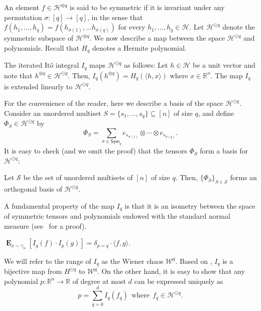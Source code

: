\documentclass{toc}
\begin{document}
An element $f  \in \mathcal{H}^{\otimes q}$ is said to be
symmetric if it is invariant under any permutation $\sigma: [q] \rightarrow
[q]$, in the sense that $f(h_1, \dots, h_q) = f(h_{\sigma(1)}, \dots
h_{\sigma(q)})$ for every $h_1, \dots, h_q \in \mathcal{H}$. Let
$\mathcal{H}^{\odot q}$ denote the symmetric subspace of
$\mathcal{H}^{\otimes q}$. 
%
%
%
%
We now describe a map
between the space $\mathcal{H}^{\odot q}$ and polynomials. Recall that $H_q$
denotes
a Hermite polynomial.
\begin{definition}
    The iterated It\^{o} integral $I_q$ maps $\mathcal{H}^{\odot q}$ as follows: Let $h \in \mathcal{H}$ be a unit vector and note that  $h^{\otimes q} \in \mathcal{H}^{\odot q}$. Then, 
$I_q(h^{\otimes q}) = H_q( \langle h , x \rangle)$ where $x \in \mathbb{R}^n$. The map $I_q$ is extended linearly to $\mathcal{H}^{\odot q}$. 
\end{definition}
For the convenience of the reader, here we describe a basis of the space $\mathcal{H}^{\odot q}$. Consider an unordered multiset $S = \{s_1, \ldots, s_q\} \subseteq [n]$ of size $q$, and define $\Phi_S \in \mathcal{H}^{\odot q}$ by
$$
\Phi_S = \sum_{\sigma \in \mathsf{Sym}_q} e_{s_{\sigma(1)}} \otimes \cdots \otimes e_{s_{\sigma(q)}}.
$$
It is easy to check (and we omit the proof) that the tensors $\Phi_S$ form a basis for $\mathcal{H}^{\odot q}$:
\begin{proposition}\label{prop:basis}
Let $\mathcal{S}$ be the set of unordered multisets of $[n]$ of size $q$. Then, $\{\Phi_S \}_{S \in \mathcal{S}}$ forms an orthogonal basis of $\mathcal{H}^{\odot q}$.
%
%
\end{proposition}
A fundamental property of the map $I_q$ is that it is an isometry between the space of symmetric tensors and polynomials endowed with the standard normal measure (see~\cite{Janson:97} for a proof). 
\begin{proposition}\label{prop:4}
$\mathop{\mathbf{E}}_{x \sim \gamma_n} [I_q(f) \cdot I_p(g)]  = \delta_{p=q} \cdot \langle f,  g \rangle$.
\end{proposition} 
We will  refer to the range of $I_q$ as the Wiener chaos $\mathcal{W}^{q}$. Based on , $I_q$ is a bijective map from $H^{\odot q}$ to $\mathcal{W}^q$. 
On the other hand, it is easy to show that any polynomial $p: \mathbb{R}^n \rightarrow \mathbb{R}$ of degree at most $d$ can be expressed uniquely as 
\begin{equation}\label{eq:tensor-decomp}
p = \sum_{q=0}^d I_q(f_q) \ \ \textrm{where}  \ \ f_q \in \mathcal{H}^{\odot q}. 
\end{equation}
\end{document}
